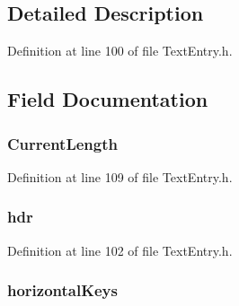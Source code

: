 \subsection{Detailed Description}


Definition at line 100 of file Text\+Entry.\+h.



\subsection{Field Documentation}
\hypertarget{struct_t_e_x_t_e_n_t_r_y_a944ce9bda9c0696403a44df80fcd195a}{}
\subsubsection[{Current\+Length}]{ Current\+Length}\label{struct_t_e_x_t_e_n_t_r_y_a944ce9bda9c0696403a44df80fcd195a}


Definition at line 109 of file Text\+Entry.\+h.

\hypertarget{struct_t_e_x_t_e_n_t_r_y_abeffaf353197a8a64fba6707b68ce0be}{}
\subsubsection[{hdr}]{ hdr}\label{struct_t_e_x_t_e_n_t_r_y_abeffaf353197a8a64fba6707b68ce0be}


Definition at line 102 of file Text\+Entry.\+h.

\hypertarget{struct_t_e_x_t_e_n_t_r_y_a1d38c220eb8760498daefd6b30513814}{}
\subsubsection[{horizontal\+Keys}]{ horizontal\+Keys}\label{struct_t_e_x_t_e_n_t_r_y_a1d38c220eb8760498daefd6b30513814}



